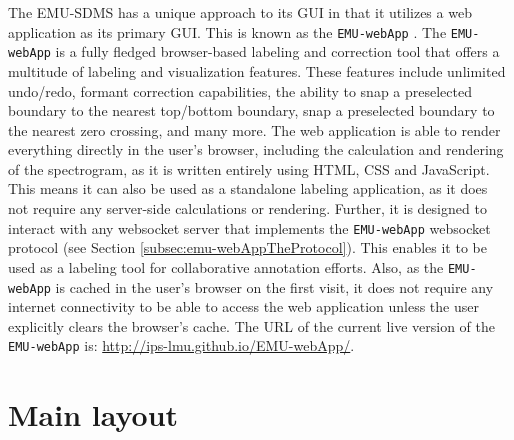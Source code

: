 \documentclass[]{book}
\theoremstyle{definition}
\theoremstyle{definition}
\theoremstyle{definition}
\theoremstyle{remark}
\begin{document}
The EMU-SDMS has a unique approach to its GUI in that it utilizes a web
application as its primary GUI. This is known as the \texttt{EMU-webApp}
\citep{winkelmann:2015d}. The \texttt{EMU-webApp} is a fully fledged
browser-based labeling and correction tool that offers a multitude of
labeling and visualization features. These features include unlimited
undo/redo, formant correction capabilities, the ability to snap a
preselected boundary to the nearest top/bottom boundary, snap a
preselected boundary to the nearest zero crossing, and many more. The
web application is able to render everything directly in the user's
browser, including the calculation and rendering of the spectrogram, as
it is written entirely using HTML, CSS and JavaScript. This means it can
also be used as a standalone labeling application, as it does not
require any server-side calculations or rendering. Further, it is
designed to interact with any websocket server that implements the
\texttt{EMU-webApp} websocket protocol (see Section
\ref{subsec:emu-webAppTheProtocol}). This enables it to be used as a
labeling tool for collaborative annotation efforts. Also, as the
\texttt{EMU-webApp} is cached in the user's browser on the first visit,
it does not require any internet connectivity to be able to access the
web application unless the user explicitly clears the browser's cache.
The URL of the current live version of the \texttt{EMU-webApp} is:
\url{http://ips-lmu.github.io/EMU-webApp/}.

\hypertarget{sec:emu-webApp-mainLayout}{%
\section{Main layout}\label{sec:emu-webApp-mainLayout}}
\end{document}
